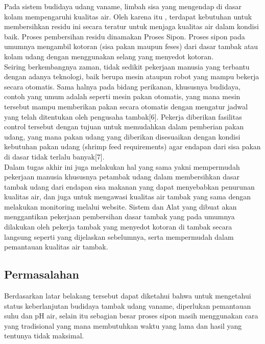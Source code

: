Pada sistem budidaya udang vaname, limbah sisa yang mengendap di dasar kolam mempengaruhi kualitas air. Oleh karena itu , terdapat kebutuhan untuk membersihkan residu ini secara teratur untuk menjaga kualitas air dalam kondisi baik. Proses pembersihan residu dinamakan Proses Sipon. Proses sipon pada umumnya mengambil kotoran (sisa pakan maupun feses) dari dasar tambak atau kolam udang dengan menggunakan selang yang menyedot kotoran. \\

Seiring berkembangnya zaman, tidak sedikit pekerjaan manusia yang terbantu dengan adanya teknologi, baik berupa mesin ataupun robot yang mampu bekerja secara otomatis. Sama halnya pada bidang perikanan, khususnya budidaya, contoh yang umum adalah seperti mesin pakan otomatis, yang mana mesin tersebut mampu memberikan pakan secara otomatis dengan mengatur jadwal yang telah ditentukan oleh pengusaha tambak[6]. Pekerja diberikan fasilitas control tersebut dengan tujuan untuk memudahkan dalam pemberian pakan udang, yang mana pakan udang yang diberikan disesuaikan dengan kondisi kebutuhan pakan udang (shrimp feed requirements) agar endapan dari sisa pakan di dasar tidak terlalu banyak[7]. \\

Dalam tugas akhir ini juga melakukan hal yang sama yakni mempermudah pekerjaan manusia khususnya petambak udang dalam membersihkan dasar tambak udang dari endapan sisa makanan yang dapat menyebabkan penurunan kualitas air, dan juga untuk mengawasi kualitas air tambak yang sama dengan melakukan monitoring melalui website. Sistem dan Alat yang dibuat akan menggantikan pekerjaan pembersihan dasar tambak yang pada umumnya dilakukan oleh pekerja tambak yang menyedot kotoran di tambak secara langsung seperti yang dijelaskan sebelumnya, serta mempermudah dalam pemantauan kualitas air tambak. \\



\subsection{Permasalahan}
\label{sec:permasalahan}

Berdasarkan latar belakang tersebut dapat diketahui bahwa untuk mengetahui status keberlanjutan budidaya tambak udang vaname, diperlukan pemantauan suhu dan pH air, selain itu sebagian besar proses sipon masih menggunakan cara yang tradisional yang mana membutuhkan waktu yang lama dan hasil yang tentunya tidak maksimal. \\

